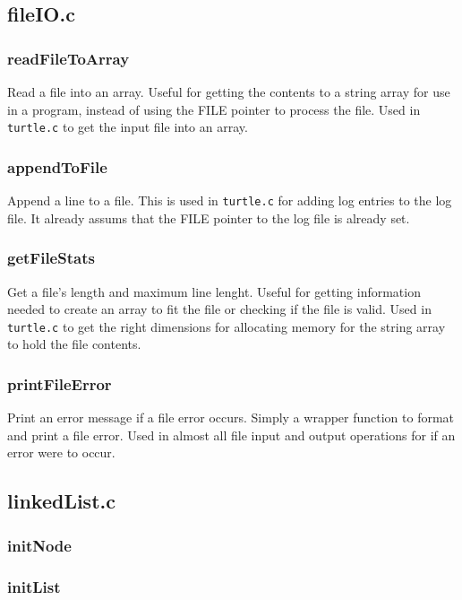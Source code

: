 \documentclass[a4paper, 12pt, titlepage]{article}
\newcommand{\code}[1]{\small\texttt{#1}\normalsize}
\begin{document}
\subsection{fileIO.c}
\subsubsection{readFileToArray}

Read a file into an array. Useful for getting the contents to a string 
array for use in a program, instead of using the FILE pointer to process 
the file. Used in \code{turtle.c} to get the input file into an array.

\subsubsection{appendToFile}

Append a line to a file. This is used in \code{turtle.c} for adding log 
entries to the log file. It already assums that the FILE pointer to the 
log file is already set.

\subsubsection{getFileStats}

Get a file's length and maximum line lenght. Useful for getting information 
needed to create an array to fit the file or checking if the file is valid. 
Used in \code{turtle.c} to get the right dimensions for allocating memory 
for the string array to hold the file contents.

\subsubsection{printFileError}

Print an error message if a file error occurs. Simply a wrapper function to 
format and print a file error. Used in almost all file input and output 
operations for if an error were to occur.

\subsection{linkedList.c}
\subsubsection{initNode}

\subsubsection{initList}
\end{document}
